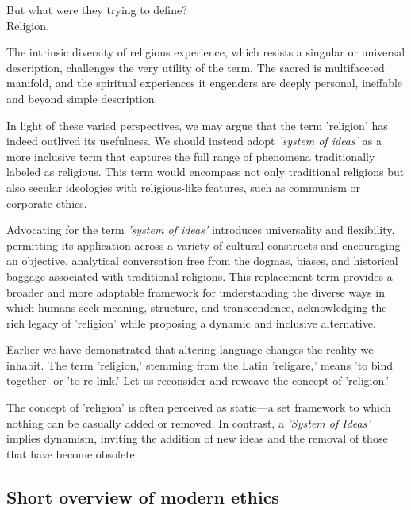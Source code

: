 \documentclass[12pt,a4]{article}
\begin{document}
But what were they trying to define?\\
Religion.
 \par

The intrinsic diversity of religious experience, which resists a singular or universal description, challenges the very utility of the term. The sacred is multifaceted manifold, and the spiritual experiences it engenders are deeply personal, ineffable and beyond simple description.
\par
In light of these varied perspectives, we may argue that the term 'religion' has indeed outlived its usefulness. We should instead adopt \textit{'system of ideas'} as a more inclusive term that captures the full range of phenomena traditionally labeled as religious. This term would encompass not only traditional religions but also secular ideologies with religious-like features, such as communism or corporate ethics.

\par
Advocating for the term \textit{'system of ideas'} introduces universality and flexibility, permitting its application across a variety of cultural constructs and encouraging an objective, analytical conversation free from the dogmas, biases, and historical baggage associated with traditional religions. This replacement term provides a broader and more adaptable framework for understanding the diverse ways in which humans seek meaning, structure, and transcendence, acknowledging the rich legacy of 'religion' while proposing a dynamic and inclusive alternative.

\par
Earlier we have demonstrated that altering language changes the reality we inhabit. The term 'religion,' stemming from the Latin 'religare,' means 'to bind together' or 'to re-link.' Let us reconsider and reweave the concept of 'religion.'
\par
The concept of 'religion' is often perceived as static—a set framework to which nothing can be casually added or removed. In contrast, a \textit{'System of Ideas'} implies dynamism, inviting the addition of new ideas and the removal of those that have become obsolete.
\par



\subsection{Short overview of modern ethics}
\end{document}
